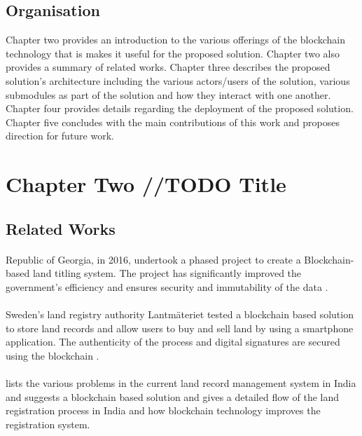 \documentclass{article}
\begin{document}
    \subsection{Organisation}
        Chapter two provides an introduction to the various offerings of the blockchain technology that is makes it useful for the proposed solution. Chapter two also provides a summary of related works. Chapter three describes the proposed solution's architecture including the various actors/users of the solution, various submodules as part of the solution and how they interact with one another. Chapter four provides details regarding the deployment of the proposed solution. Chapter five concludes with the main contributions of this work and proposes direction for future work.
        
\section{Chapter Two //TODO Title}
    \subsection{Related Works}
        \paragraph{}
        Republic of Georgia, in 2016, undertook a phased project to create a Blockchain-based land titling system. The project has significantly improved the government’s efficiency and ensures security and immutability of the data \cite{10.1162/inov_a_00276}.

        \paragraph{}
        Sweden’s land registry authority Lantmäteriet tested a blockchain based solution to store land records and allow users to buy and sell land by using a smartphone application. The authenticity of the process and digital signatures are secured using the blockchain \cite{sweden}.
        
        \paragraph{}
        \cite{THAKUR2020101940} lists the various problems in the current land record management system in India and suggests a blockchain based solution and gives a detailed flow of the land registration process in India and how blockchain technology improves the registration system.
\end{document}

